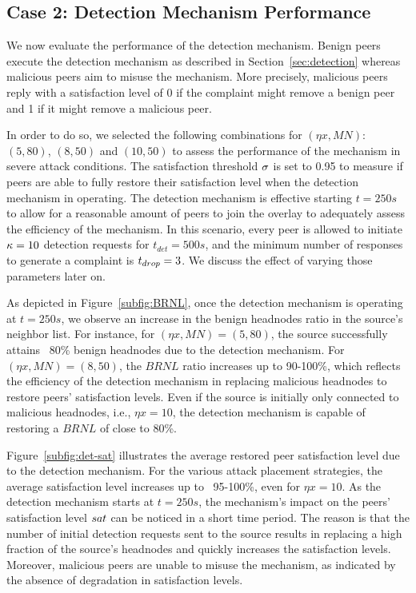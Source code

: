 \subsection{Case 2: Detection Mechanism Performance}

We now evaluate the performance of the detection mechanism.
Benign peers execute the detection mechanism as described in Section~\ref{sec:detection} whereas malicious peers aim to misuse the mechanism.
More precisely, malicious peers reply with a satisfaction level of 0 if the complaint might remove a benign peer and 1 if it might remove a malicious peer. 

In order to do so, we selected the following combinations for $(\eta x, MN)$: $(5, 80)$, $(8, 50)$ and $(10, 50)$ to assess the performance of the mechanism in severe attack conditions.
The satisfaction threshold $\sigma$ is set to 0.95 to measure if peers are able to fully restore their satisfaction level when the detection mechanism in operating.
The detection mechanism is effective starting $t=250s$ to allow for a reasonable amount of peers to join the overlay to adequately assess the efficiency of the mechanism.
In this scenario, every peer is allowed to initiate $\kappa=10$ detection requests for $t_{det}=500s$, and the minimum number of responses to generate a complaint is $t_{drop}=3$. 
We discuss the effect of varying those parameters later on.

As depicted in Figure~\ref{subfig:BRNL}, once the detection mechanism is operating at $t=250s$, we observe an increase in the benign headnodes ratio in the source's neighbor list.
For instance, for $(\eta x, MN)=(5, 80)$, the source successfully attains ~80\% benign headnodes due to the detection mechanism.
For $(\eta x, MN)=(8, 50)$, the $BRNL$ ratio increases up to 90-100\%, which reflects the efficiency of the detection mechanism in replacing malicious headnodes to restore peers' satisfaction levels. 
Even if the source is initially only connected to malicious headnodes, i.e., $\eta x=10$, the detection mechanism is capable of restoring a $BRNL$ of close to 80\%. 

Figure~\ref{subfig:det-sat} illustrates the average restored peer satisfaction level due to the detection mechanism.
For the various attack placement strategies, the average satisfaction level increases up to ~95-100\%, even for $\eta x=10$.
As the detection mechanism starts at $t=250s$, the mechanism's impact on the peers' satisfaction level $sat$ can be noticed in a short time period.
The reason is that the number of initial detection requests sent to the source results in replacing a high fraction of the source's headnodes and quickly increases the satisfaction levels. 
Moreover, malicious peers are unable to misuse the mechanism, as indicated by the absence of degradation in satisfaction levels. 

